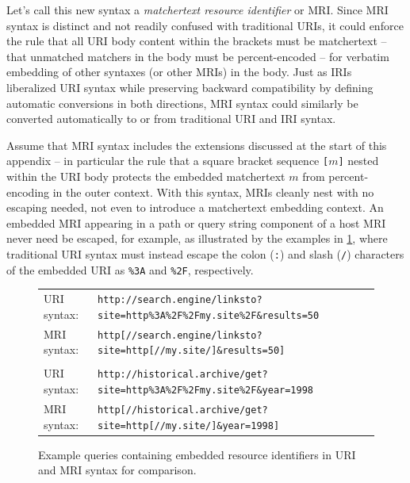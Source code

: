 Let's call this new syntax
a \emph{matchertext resource identifier} or MRI.
Since MRI syntax is distinct and not readily confused with traditional URIs,
it could enforce the rule that all URI body content within the brackets
must be matchertext --
\ie that unmatched matchers in the body must be percent-encoded --
for verbatim embedding of other syntaxes (or other MRIs) in the body.
Just as IRIs~\cite{rfc3987} liberalized URI syntax
while preserving backward compatibility
by defining automatic conversions in both directions,
MRI syntax could similarly be converted automatically
to or from traditional URI and IRI syntax.

Assume that MRI syntax includes the extensions
discussed at the start of this appendix --
in particular the rule that a square bracket sequence \verb|[|$m$\verb|]|
nested within the URI body protects the embedded matchertext $m$
from percent-encoding in the outer context.
With this syntax, MRIs cleanly nest with no escaping needed,
not even to introduce a matchertext embedding context.
An embedded MRI appearing in a path or query string component
of a host MRI never need be escaped, for example,
as illustrated by the examples in \cref{fig:search-query},
where traditional URI syntax must instead escape
the colon (\verb|:|) and slash (\verb|/|) characters
of the embedded URI as \verb|%3A| and \verb|%2F|, respectively.

\begin{figure}[h]
\begin{center}
\begin{small}
\begin{tabular}{ll}
URI syntax:	& \verb|http://search.engine/linksto?site=http%3A%2F%2Fmy.site%2F&results=50| \\
MRI syntax:	& \verb|http[//search.engine/linksto?site=http[//my.site/]&results=50]| \\
\\
URI syntax:	& \verb|http://historical.archive/get?site=http%3A%2F%2Fmy.site%2F&year=1998| \\
MRI syntax:	& \verb|http[//historical.archive/get?site=http[//my.site/]&year=1998]| \\
\end{tabular}
\end{small}
\end{center}
\caption{Example queries containing embedded resource identifiers
	in URI and MRI syntax for comparison.}
\label{fig:search-query}
\end{figure}

